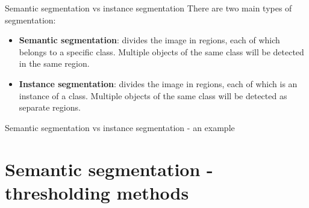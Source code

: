 \documentclass[9pt, aspectratio=169]{beamer}
\begin{document}
\begin{frame}
    {Semantic segmentation vs instance segmentation}
    There are two main types of segmentation:

    \begin{itemize}
        \item \textbf{Semantic segmentation}: divides the image in regions, each of which belongs to a specific class. Multiple objects of the same class will be detected in the same region.
        \item \textbf{Instance segmentation}: divides the image in regions, each of which is an instance of a class. Multiple objects of the same class will be detected as separate regions.
    \end{itemize}
\end{frame}

\begin{frame}
    {Semantic segmentation vs instance segmentation - an example}
\end{frame}

\section{Semantic segmentation - thresholding methods}
\end{document}
